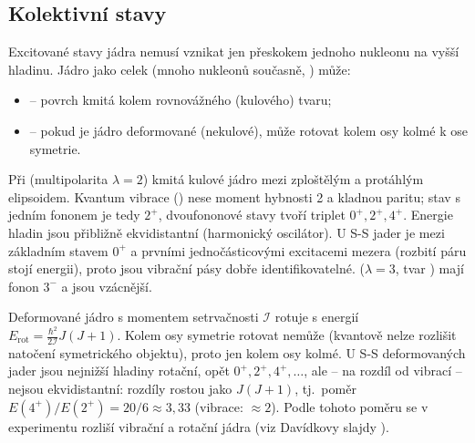 \subsection{Kolektivní stavy}

Excitované stavy jádra nemusí vznikat jen přeskokem jednoho nukleonu na
vyšší hladinu. Jádro jako celek (mnoho nukleonů současně, )
může:
\begin{itemize}
  \item {} -- povrch kmitá kolem rovnovážného (kulového) tvaru;
  \item {} -- pokud je jádro deformované (nekulové), může rotovat
    kolem osy kolmé k ose symetrie.
\end{itemize}

\begin{center}
\end{center}

Při  (multipolarita \(\lambda=2\)) kmitá kulové
jádro mezi zploštělým a protáhlým elipsoidem. Kvantum vibrace ()
nese moment hybnosti 2 a kladnou paritu; stav s jedním fononem je tedy
\(2^+\), dvoufononové stavy tvoří triplet \(0^+,2^+,4^+\). Energie hladin jsou
přibližně ekvidistantní (harmonický oscilátor). U S-S jader je mezi
základním stavem \(0^+\) a prvními jednočásticovými excitacemi mezera
(rozbití páru stojí energii), proto jsou vibrační pásy dobře
identifikovatelné.  (\(\lambda=3\), tvar
) mají fonon \(3^-\) a jsou vzácnější.

\begin{vysvetleni}
Deformované jádro s momentem setrvačnosti \(\mathcal I\) rotuje s energií
\(E_{\text{rot}} = \frac{\hbar^2}{2\mathcal I}J(J+1)\). Kolem osy symetrie
rotovat nemůže (kvantově nelze rozlišit natočení symetrického objektu), proto
jen kolem osy kolmé. U S-S deformovaných jader jsou nejnižší hladiny
rotační, opět \(0^+,2^+,4^+,\dots\), ale -- na rozdíl od vibrací -- nejsou
ekvidistantní: rozdíly rostou jako \(J(J+1)\), tj.\ poměr
\(E(4^+)/E(2^+)=20/6\approx3{,}33\) (vibrace: \(\approx2\)). Podle tohoto
poměru se v experimentu rozliší vibrační a rotační jádra (viz Davídkovy
slajdy ).
\end{vysvetleni}
